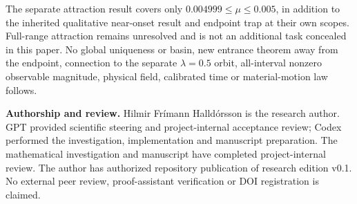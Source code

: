 \documentclass[11pt,a4paper]{article}
\numberwithin{equation}{section}
\begin{document}
The separate attraction result covers only $0.004999\le\mu\le0.005$, in addition to the inherited qualitative near-onset result and endpoint trap at their own scopes. Full-range attraction remains unresolved and is not an additional task concealed in this paper. No global uniqueness or basin, new entrance theorem away from the endpoint, connection to the separate $\lambda=0.5$ orbit, all-interval nonzero observable magnitude, physical field, calibrated time or material-motion law follows.

\textbf{Authorship and review.} Hilmir Fr\'imann Halld\'orsson is the research author. GPT provided scientific steering and project-internal acceptance review; Codex performed the investigation, implementation and manuscript preparation. The mathematical investigation and manuscript have completed project-internal review. The author has authorized repository publication of research edition v0.1. No external peer review, proof-assistant verification or DOI registration is claimed.


\end{document}
